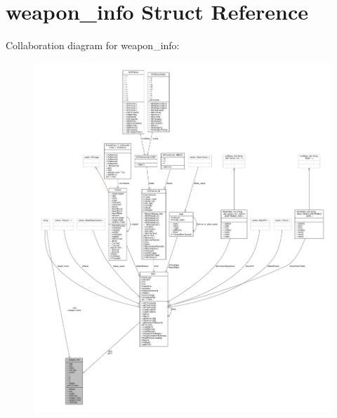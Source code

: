 \hypertarget{structweapon__info}{}\section{weapon\+\_\+info Struct Reference}
\label{structweapon__info}


Collaboration diagram for weapon\+\_\+info\+:
\nopagebreak
\begin{figure}[H]
\begin{center}
\leavevmode
\includegraphics[width=350pt]{d0/d53/structweapon__info__coll__graph}
\end{center}
\end{figure}
